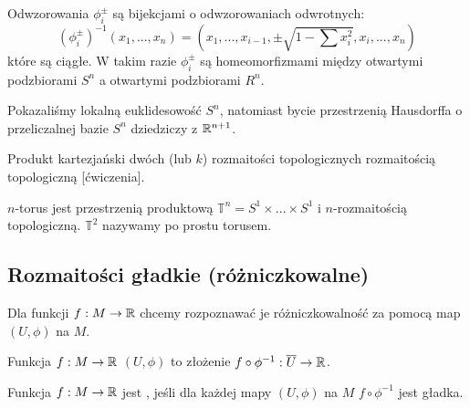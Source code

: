 \begin{example}
      Odwzorowania $\phi_i^\pm$ są bijekcjami o odwzorowaniach odwrotnych:
      $$(\phi_i^\pm)^{-1}(x_1,...,x_n)=(x_1,...,x_{i-1}, \pm\sqrt{1-\sum x_i^2},x_i,...,x_n)$$
      które są ciągłe. W takim razie $\phi_i^\pm$ są homeomorfizmami między otwartymi podzbiorami $S^n$ a otwartymi podzbiorami $R^n$.

      Pokazaliśmy lokalną euklidesowość $S^n$, natomiast bycie przestrzenią Hausdorffa o przeliczalnej bazie $S^n$ dziedziczy z $\mathbb{R}^{n+1}$.
      
    \item Produkt kartezjański dwóch (lub $k$) rozmaitości topologicznych rozmaitością topologiczną [ćwiczenia].
    \item $n$-torus jest przestrzenią produktową $\mathds{T}^n=S^1\times...\times S^1$ i $n$-rozmaitością topologiczną. $\mathds{T}^2$ nazywamy po prostu torusem.
\end{example}


\subsection{Rozmaitości gładkie (różniczkowalne)}

Dla funkcji $f:M\to \mathbb{R}$ chcemy rozpoznawać je różniczkowalność za pomocą map $(U, \phi)$ na $M$.

\begin{wrapfigure}{r}{5.5cm}
\centering
{}
\end{wrapfigure}
Funkcja $f:M\to\mathbb{R}$  $(U,\phi)$ to złożenie $f\circ\phi^{-1}:\overline{U}\to \mathbb{R}$.

\begin{definition} Funkcja $f:M\to \mathbb{R}$ jest , jeśli dla każdej mapy $(U, \phi)$ na $M$ $f\circ\phi^{-1}$ jest gładka.
\end{definition}

